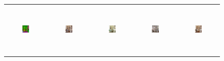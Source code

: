 \begin{figure}[]
\begin{tabular} {cc|cc|c}
\includegraphics[width=0.1932\textwidth,height=0.96in]{Images/Rec/ADE/label/ADE_val_00001090.png} & \includegraphics[width=0.1932\textwidth,height=0.96in]{Images/Rec/ADE/gt/ADE_val_00001090.jpg} &
\includegraphics[width=0.1932\textwidth,height=0.96in]{Images/Rec/ADE/pix2pixhd/ADE_val_00001090.jpg} &   \includegraphics[width=0.1932\textwidth,height=0.96in]{Images/Rec/ADE/spade/ADE_val_00001090.jpg} &  \includegraphics[width=0.1932\textwidth,height=0.96in]{Images/Rec/ADE/ours/ADE_val_00001090.png} \\


\end{tabular}
\end{figure}
